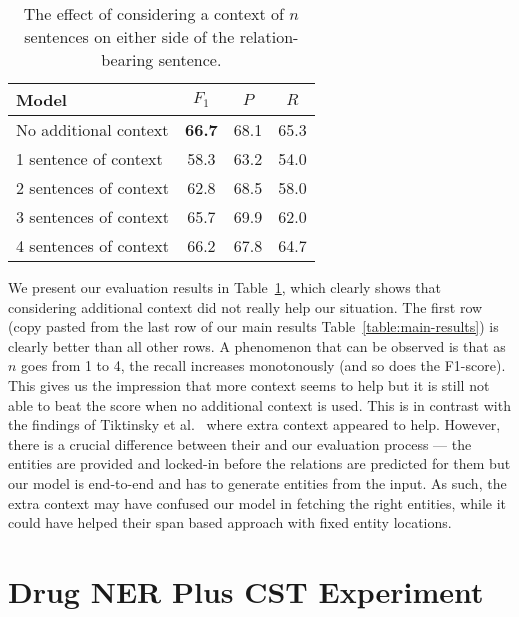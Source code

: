 \documentclass[conference]{IEEEtran}
\begin{document}
\begin{table}[h]
\centering
\renewcommand{\arraystretch}{1.3}
\caption{The effect of considering a context of $n$ sentences on either side of the relation-bearing sentence.}
\label{tb:long-context}
\begin{tabular}{lccc}
\toprule
Model & $F_1$ & $P$ & $R$\\\midrule
No additional context & \textbf{66.7} & 68.1 & 65.3 \\
 1 sentence of context & 58.3 & 63.2 & 54.0\\
 2 sentences of context & 62.8 & 68.5 & 58.0\\
 3 sentences of context & 65.7 & 69.9 & 62.0\\
 4 sentences of context & 66.2 & 67.8 & 64.7\\
\bottomrule
\end{tabular}


\end{table}

We present our evaluation results in Table~\ref{tb:long-context}, which clearly shows that considering additional context did not really help our situation. The first row (copy pasted from the last row of our main results  Table~\ref{table:main-results}) is clearly better than all other rows. A phenomenon that can be observed is that as $n$ goes from 1 to 4, the recall increases monotonously (and so does the F1-score). This gives us the impression that more context seems to help but it is still not able to beat the score when no additional context is used. This is in contrast with the findings of Tiktinsky et al.~\cite{tiktinsky-etal-2022-dataset} where extra context appeared to help. However, there is a crucial difference between their and our evaluation process --- the entities are provided and locked-in before the relations are predicted for them but our model is end-to-end and has to generate entities from the input. As such, the extra context may have confused our model in fetching the right entities, while it could have helped their span based approach with fixed entity locations.  







\section{Drug NER Plus CST Experiment}
\end{document}
